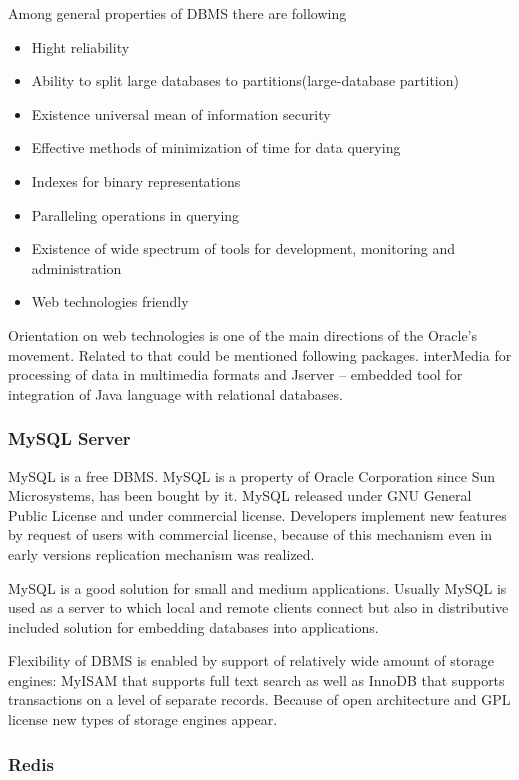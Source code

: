 \documentclass[thesis=M,english]{FITthesis}[2012/10/20]
\begin{document}
Among general properties of DBMS there are following

\begin{itemize}
	\item Hight reliability
	\item Ability to split large databases to partitions(large-database partition) 
	\item Existence universal mean of information security
	\item Effective methods of minimization of time for data querying 
	\item Indexes for binary representations
	\item Paralleling operations in querying
	\item Existence of wide spectrum of tools for development, monitoring and administration
	\item Web technologies friendly
\end{itemize}

Orientation on web technologies is one of the main directions of the Oracle's movement. Related to that could be mentioned following packages. interMedia for processing of data in multimedia formats and Jserver -- embedded tool for integration of Java language with relational databases.

\subsubsection{MySQL Server}

MySQL is a free DBMS. MySQL is a property of Oracle Corporation since Sun Microsystems, has been bought by it. MySQL released under GNU General Public License and under commercial license. Developers implement new features by request of users with commercial license, because of this mechanism even in early versions replication mechanism was realized.

MySQL is a good solution for small and medium applications. Usually MySQL is used as a server to which local and remote clients connect but also in distributive included solution for embedding databases into applications.

Flexibility of DBMS is enabled by support of relatively wide amount of storage engines: MyISAM that supports full text search as well as InnoDB that supports transactions on a level of separate records. Because of open architecture and GPL license new types of storage engines appear.

\subsubsection{Redis}
\end{document}
